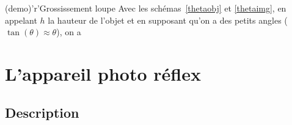 \documentclass[../../main/main.tex]{subfiles}
\begin{document}
\begin{tcbraster}[raster columns=3, raster equal height=rows]
\begin{tcolorbox}[blankest, raster multicolumn=1]
\begin{tcbraster}[raster columns=1]
			\begin{tcb}[label=demo_gross-loupe](demo)'r'{Grossissement loupe}
				Avec les schémas~\ref{thetaobj} et \ref{thetaimg}, en
				appelant $h$ la hauteur de l'objet et en supposant qu'on a des
				petits angles ($\tan(\theta)\approx\theta$), on a
			\end{tcb}
		\end{tcbraster}
	\end{tcolorbox}
\end{tcbraster}

\section{L'appareil photo réflex}

\subsection{Description}
\end{document}
